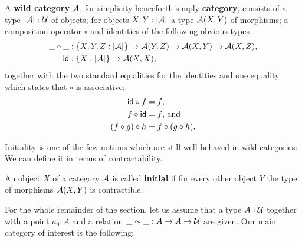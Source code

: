 \begin{defn}
A \textbf{wild category} $\mathcal A$, for simplicity henceforth simply
\textbf{category}, consists of a type $\mathopen{}\left|\mathcal A\right|_{}^{}\mathclose{} : \mathcal{U}$ of objects; for
objects $X, Y : \mathopen{}\left|\mathcal A\right|_{}^{}\mathclose{}$ a type $\mathcal A(X, Y)$ of morphisms;
a composition operator $\circ$ and identities of the following obvious types
\begin{align*}
\_\circ\_ &: \{X, Y, Z : \mathopen{}\left|\mathcal A\right|_{}^{}\mathclose{}\} \to \mathcal A(Y, Z) \to \mathcal A(X, Y) \to \mathcal A(X, Z) \text{,} \\
\mathsf{id} &: \{X : \mathopen{}\left|\mathcal A\right|_{}^{}\mathclose{}\} \to \mathcal A(X, X) \text{,}
\end{align*}
together with the two standard equalities for the identities and
one equality which states that $\circ$ is associative:
\begin{align*}
\mathsf{id} \circ f &= f \text{,}\\
f \circ \mathsf{id} &= f \text{, and}\\
(f \circ g) \circ h &= f \circ (g \circ h) \text{.}
\end{align*}
\end{defn}

Initiality is one of the few notions which are still well-behaved
in wild categories:
We can define it in terms of contractability.
\begin{defn}[Initiality]
An object $X$ of a category $\mathcal A$ is called \textbf{initial} if for every other
object $Y$ the type of morphisms $\mathcal A(X, Y)$ is contractible.
\end{defn}

For the whole remainder of the section, let us assume that a type $A : \mathcal{U}$
together with a point $a_0 : A$ and a relation $\_\sim\_ : A \to A \to \mathcal{U}$ are
given.
Our main category of interest is the following:

